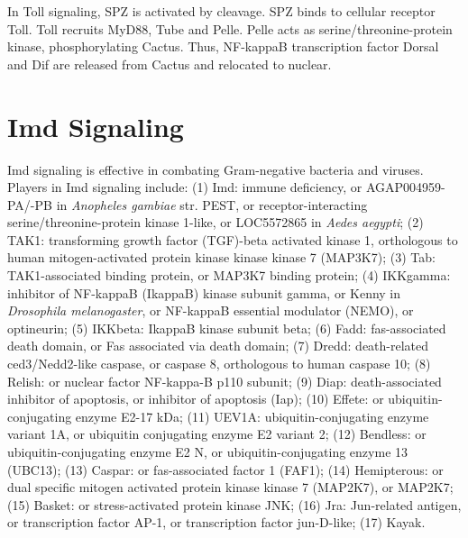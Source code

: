 \documentclass[11pt]{article}
\begin{document}
\begin{sloppypar}
\par

In Toll signaling, SPZ is activated by cleavage. 
SPZ binds to cellular receptor Toll. 
Toll recruits MyD88, Tube and Pelle. 
Pelle acts as serine/threonine-protein kinase, phosphorylating Cactus. 
Thus, NF-kappaB transcription factor Dorsal and Dif are released from Cactus and relocated to nuclear.

\section{Imd Signaling}
Imd signaling is effective in combating Gram-negative bacteria and viruses. 
Players in Imd signaling include: 
\newline
(1) Imd: immune deficiency, or AGAP004959-PA/-PB in \textit{Anopheles gambiae} str. PEST, or receptor-interacting serine/threonine-protein kinase 1-like, or LOC5572865 in \textit{Aedes aegypti}; \newline
(2) TAK1: transforming growth factor (TGF)-beta activated kinase 1, orthologous to human mitogen-activated protein kinase kinase kinase 7 (MAP3K7); \newline
(3) Tab: TAK1-associated binding protein, or MAP3K7 binding protein; \newline
(4) IKKgamma: inhibitor of NF-kappaB (IkappaB) kinase subunit gamma, or Kenny in \textit{Drosophila melanogaster}, or NF-kappaB essential modulator (NEMO), or optineurin; \newline
(5) IKKbeta: IkappaB kinase subunit beta; \newline
(6) Fadd: fas-associated death domain, or Fas associated via death domain; \newline
(7) Dredd: death-related ced3/Nedd2-like caspase, or caspase 8, orthologous to human caspase 10; 
\newline
(8) Relish: or nuclear factor NF-kappa-B p110 subunit; \newline
(9) Diap: death-associated inhibitor of apoptosis, or inhibitor of apoptosis (Iap); \newline
(10) Effete: or ubiquitin-conjugating enzyme E2-17 kDa; \newline
(11) UEV1A: ubiquitin-conjugating enzyme variant 1A, or ubiquitin conjugating enzyme E2 variant 2; \newline
(12) Bendless: or ubiquitin-conjugating enzyme E2 N, or ubiquitin-conjugating enzyme 13 (UBC13); \newline
(13) Caspar: or fas-associated factor 1 (FAF1); \newline
(14) Hemipterous: or dual specific mitogen activated protein kinase kinase 7 (MAP2K7), or MAP2K7; \newline
(15) Basket: or stress-activated protein kinase JNK; \newline
(16) Jra: Jun-related antigen, or transcription factor AP-1, or transcription factor jun-D-like; \newline
(17) Kayak. 


\end{sloppypar}
\end{document}
